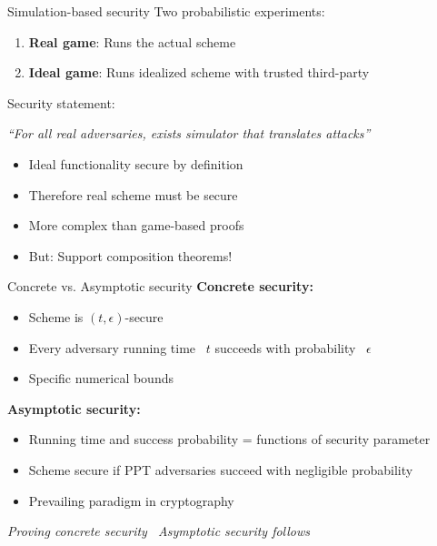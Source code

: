 \documentclass[aspectratio=169, lualatex, handout]{beamer}
\begin{document}
\begin{frame}{Simulation-based security}
	Two probabilistic experiments:
	\vspace{0.5em}
	\begin{enumerate}
		\item \textbf{Real game}: Runs the actual scheme
		\item \textbf{Ideal game}: Runs idealized scheme with trusted third-party
	\end{enumerate}
	\vspace{0.5em}
	Security statement:
	\begin{center}
		\textit{``For all real adversaries, exists simulator that translates attacks''}
	\end{center}
	\vspace{0.5em}
	\begin{itemize}
		\item Ideal functionality secure by definition
		\item Therefore real scheme must be secure
		\item More complex than game-based proofs
		\item But: Support composition theorems!
	\end{itemize}
\end{frame}

\begin{frame}{Concrete vs. Asymptotic security}
	\textbf{Concrete security:}
	\begin{itemize}
		\item Scheme is $(t,\epsilon)$-secure
		\item Every adversary running time \leq\ $t$ succeeds with probability \leq\ $\epsilon$
		\item Specific numerical bounds
	\end{itemize}
	\vspace{0.5em}
	\textbf{Asymptotic security:}
	\begin{itemize}
		\item Running time and success probability = functions of security parameter
		\item Scheme secure if PPT adversaries succeed with negligible probability
		\item Prevailing paradigm in cryptography
	\end{itemize}
	\vspace{0.5em}
	\begin{center}
		\textit{Proving concrete security \rightarrow\ Asymptotic security follows}
	\end{center}
\end{frame}
\end{document}
